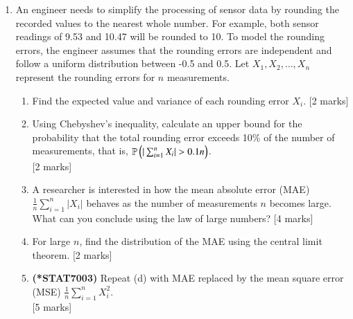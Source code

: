 \documentclass[12pt]{article}
\begin{document}
\begin{enumerate}
\begin{enumerate}
\item Find the joint probability mass function (PMF) of $X$ and $Y$. 
			\hfill [8 marks]
%
\item Are $X$ and $Y$ independent? Justify your answer.  
			\hfill [2 marks]
%
\item Determine the joint PMF of $A$ and $A+B$. 
			\hfill [4 marks]
%
\item Find the PMF of $Z$.  
			\hfill [6 marks]
%
\item{\bf (*STAT7003)} 
Suppose the test is repeated independently $N$ times. Let $N_A$ be the number of times machine A completes the task before machine B. What is the distribution of $N_A$? What is the probability that machine A is faster than machine B in more than half of the $N$ trials?
			\\\phantom{1}\hfill [10 marks]
\end{enumerate}

\vspace{5pt}
\item An engineer needs to simplify the processing of sensor data by rounding the recorded values to the nearest whole number. For example, both sensor readings of 9.53 and 10.47 will be rounded to 10. To model the rounding errors, the engineer assumes that the rounding errors are independent and follow a uniform distribution between -0.5 and 0.5. Let $X_1, X_2, \ldots, X_n$ represent the rounding errors for $n$ measurements.  

\begin{enumerate}
\item Find the expected value and variance of each rounding error $X_i$.
			\hfill [2 marks]
%
\item Using Chebyshev's inequality, calculate an upper bound for the probability that the total rounding error exceeds 10\% of the number of measurements, that is, ${\mathbb P}\left(|\sum_{i=1}^n X_i| > 0.1 n\right)$. 
			\\\phantom{1}\hfill [2 marks]
%
\item A researcher is interested in how the mean absolute error (MAE) $\frac{1}{n} \sum_{i=1}^n |X_i|$ behaves as the number of measurements $n$ becomes large. What can you conclude using the law of large numbers?
			\hfill [4 marks]
%
\item For large $n$, find the distribution of the MAE using the central limit theorem. 
			\hfill [2 marks]
%
\item 
{\bf (*STAT7003)} Repeat (d) with MAE replaced by the mean square error (MSE) $\frac{1}{n} \sum_{i=1}^n X_i^2$. 
			\\\phantom{1}\hfill [5 marks]
%
\end{enumerate}


\end{enumerate}
\end{document}

